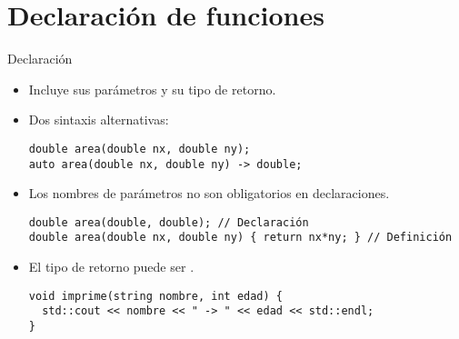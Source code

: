 \section{Declaración de funciones}

\begin{frame}[fragile]{Declaración}
\begin{itemize}
  \item Incluye sus parámetros y su tipo de retorno.
  \item Dos sintaxis alternativas:
\begin{lstlisting}
double area(double nx, double ny);
auto area(double nx, double ny) -> double;
\end{lstlisting}

  \item Los nombres de parámetros no son obligatorios en declaraciones.
\begin{lstlisting}
double area(double, double); // Declaración
double area(double nx, double ny) { return nx*ny; } // Definición
\end{lstlisting}

  \item El tipo de retorno puede ser .
\begin{lstlisting}
void imprime(string nombre, int edad) {
  std::cout << nombre << " -> " << edad << std::endl;
}
\end{lstlisting}
\end{itemize}
\end{frame}
